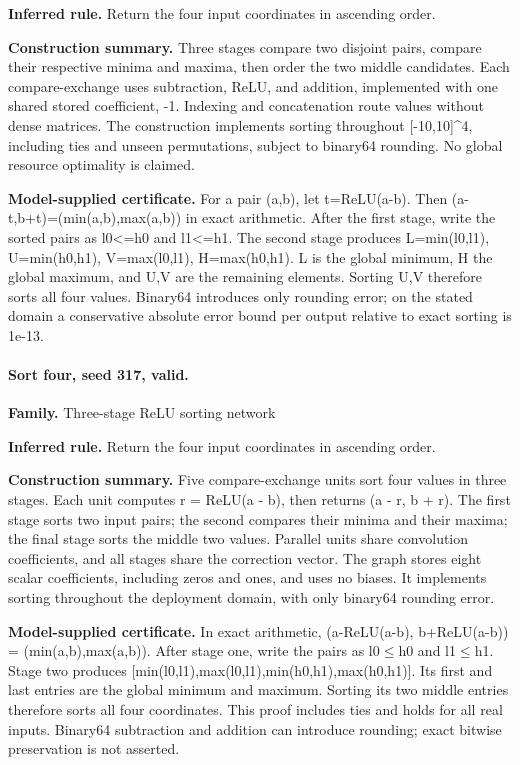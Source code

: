 \textbf{Inferred rule.} Return the four input coordinates in ascending order.


\textbf{Construction summary.} Three stages compare two disjoint pairs, compare their respective minima and maxima, then order the two middle candidates. Each compare-exchange uses subtraction, ReLU, and addition, implemented with one shared stored coefficient, -1. Indexing and concatenation route values without dense matrices. The construction implements sorting throughout [-10,10]\textasciicircum{}4, including ties and unseen permutations, subject to binary64 rounding. No global resource optimality is claimed.


\textbf{Model-supplied certificate.} For a pair (a,b), let t=ReLU(a-b). Then (a-t,b+t)=(min(a,b),max(a,b)) in exact arithmetic. After the first stage, write the sorted pairs as l0<=h0 and l1<=h1. The second stage produces L=min(l0,l1), U=min(h0,h1), V=max(l0,l1), H=max(h0,h1). L is the global minimum, H the global maximum, and U,V are the remaining elements. Sorting U,V therefore sorts all four values. Binary64 introduces only rounding error; on the stated domain a conservative absolute error bound per output relative to exact sorting is 1e-13.


\paragraph{Sort four, seed 317, valid.}

\textbf{Family.} Three-stage ReLU sorting network


\textbf{Inferred rule.} Return the four input coordinates in ascending order.


\textbf{Construction summary.} Five compare-exchange units sort four values in three stages. Each unit computes r = ReLU(a - b), then returns (a - r, b + r). The first stage sorts two input pairs; the second compares their minima and their maxima; the final stage sorts the middle two values. Parallel units share convolution coefficients, and all stages share the correction vector. The graph stores eight scalar coefficients, including zeros and ones, and uses no biases. It implements sorting throughout the deployment domain, with only binary64 rounding error.


\textbf{Model-supplied certificate.} In exact arithmetic, (a-ReLU(a-b), b+ReLU(a-b)) = (min(a,b),max(a,b)). After stage one, write the pairs as l0\ensuremath{\leq}h0 and l1\ensuremath{\leq}h1. Stage two produces [min(l0,l1),max(l0,l1),min(h0,h1),max(h0,h1)]. Its first and last entries are the global minimum and maximum. Sorting its two middle entries therefore sorts all four coordinates. This proof includes ties and holds for all real inputs. Binary64 subtraction and addition can introduce rounding; exact bitwise preservation is not asserted.


